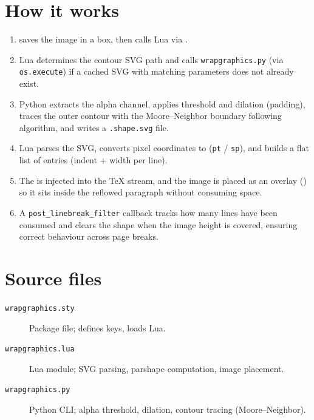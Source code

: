 \documentclass{article}
\begin{document}
\clearpage
\section{How it works}

\begin{enumerate}
  \item \texttt{\string\wrapgraphics} saves the image in a box, then
    calls Lua via \texttt{\string\directlua}.
  \item Lua determines the contour SVG path and calls
    \texttt{wrapgraphics.py} (via \texttt{os.execute}) if a cached SVG
    with matching parameters does not already exist.
  \item Python extracts the alpha channel, applies threshold and
    dilation (padding), traces the outer contour with the
    Moore--Neighbor boundary following algorithm, and writes a
    \texttt{.shape.svg} file.
  \item Lua parses the SVG, converts pixel coordinates to
    (\texttt{pt} / \texttt{sp}), and builds a flat list of
    \texttt{\string\parshape} entries (indent + width per line).
  \item The \texttt{\string\parshape} is injected into the TeX stream,
    and the image is placed as an overlay (\texttt{\string\rlap})
    so it sits inside the reflowed paragraph without consuming space.
  \item A \texttt{post\_linebreak\_filter} callback tracks how many
    lines have been consumed and clears the shape when the image height
    is covered, ensuring correct behaviour across page breaks.
\end{enumerate}

\section{Source files}

\begin{description}
  \item[\texttt{wrapgraphics.sty}]  Package file; defines keys, loads Lua.
  \item[\texttt{wrapgraphics.lua}]  Lua module; SVG parsing, parshape
    computation, image placement.
  \item[\texttt{wrapgraphics.py}]   Python CLI; alpha threshold,
    dilation, contour tracing (Moore--Neighbor).
\end{description}
\end{document}
